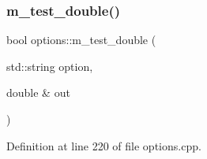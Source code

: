 \mbox{\label{classoptions_a0eebdb8dbce454720ef9251fcd7abf24}} 
\subsubsection{\texorpdfstring{m\+\_\+test\+\_\+double()}{m\_test\_double()}}
{\footnotesize\ttfamily bool options\+::m\+\_\+test\+\_\+double (\begin{DoxyParamCaption}\item[{std\+::string}]{option,  }\item[{double \&}]{out }\end{DoxyParamCaption})\hspace{0.3cm}{\ttfamily [private]}}



Definition at line 220 of file options.\+cpp.


